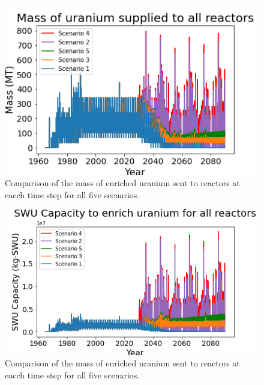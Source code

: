 \begin{figure}
    \centering
    \includegraphics{../figures/fuelsupply_scenarios_all.png}
    \caption{Comparison of the mass of enriched uranium sent to reactors 
    at eacch time step for all five scenarios.}
    \label{fig:fuel_all}
\end{figure}



\begin{figure}
    \centering
    \includegraphics{../figures/totalswu_scenarios_all.png}
    \caption{Comparison of the mass of enriched uranium sent to reactors 
    at eacch time step for all five scenarios.}
    \label{fig:swu_all}
\end{figure}